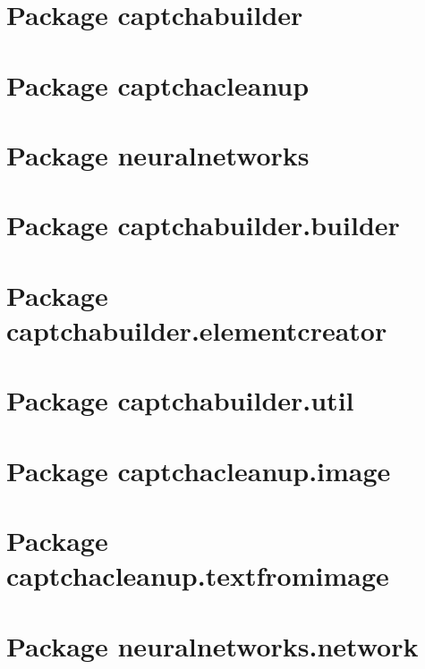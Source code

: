 
\section{Package captchabuilder}

\section{Package captchacleanup}

\section{Package neuralnetworks}

\section{Package captchabuilder.builder}

\section{Package captchabuilder.elementcreator}

\section{Package captchabuilder.util}

\section{Package captchacleanup.image}

\section{Package captchacleanup.textfromimage}

\section{Package neuralnetworks.network}


